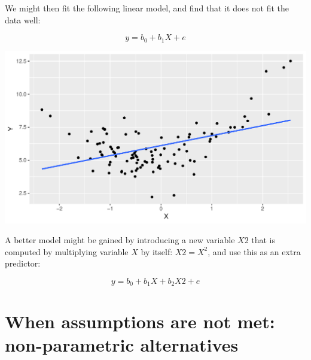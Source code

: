 \documentclass[]{report}\usepackage[]{graphicx}\usepackage[]{color}
\makeatletter
\def\maxwidth{ %
  \ifdim\Gin@nat@width>\linewidth
    \linewidth
  \else
    \Gin@nat@width
  \fi
}
\newenvironment{knitrout}{}{} %
\makeatother
\begin{document}
We might then fit the following linear model, and find that it does not fit the data well:

\begin{equation}
y = b_0 + b_1 X + e 
\end{equation}

\begin{knitrout}
\color{fgcolor}

{\centering \includegraphics[width=\maxwidth]{figure/nonpar2-1} 

}



\end{knitrout}

A better model might be gained by introducing a new variable $X2$ that is computed by multiplying variable $X$ by itself: $X2=X^2$, and use this as an extra predictor:

\begin{equation}
y = b_0 + b_1 X + b_2 X2 + e 
\end{equation}




\chapter{When assumptions are not met: non-parametric alternatives}\label{chap:nonpar1}
\end{document}
